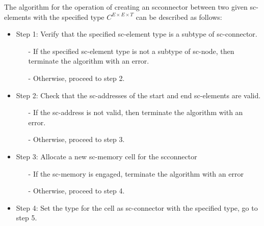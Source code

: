 \documentclass{article}
\begin{document}
\begin{multicols}{2}
The algorithm for the operation of creating an scconnector between two given sc-elements with the specified type \textit{$C^{E\times{E\times{T}}}$} can be described as follows:

\begin{itemize}
\itemsep=0mm
\item Step 1: Verify that the specified sc-element type is
a subtype of sc-connector.


\begin{itemize}
\itemsep=0mm
\item[-]If the specified sc-element type is not a subtype
of sc-node, then terminate the algorithm with an
error.

\item[-]Otherwise, proceed to step 2.
\end{itemize}
\end{itemize}

\begin{itemize}
\itemsep=0mm
\item Step 2: Check that the sc-addresses of the start and
end sc-elements are valid.


\begin{itemize}
\itemsep=0mm
\item[-] If the sc-address is not valid, then terminate the
algorithm with an error.

\item[-]Otherwise, proceed to step 3.
\end{itemize}
\end{itemize}

\begin{itemize}
\itemsep=0mm
\item Step 3: Allocate a new sc-memory cell for the scconnector

\begin{itemize}
\itemsep=0mm
\item[-] If the sc-memory is engaged, terminate the algorithm with an error

\item[-]Otherwise, proceed to step 4.
\end{itemize}
\end{itemize}

\begin{itemize}
\itemsep=0mm
\item Step 4: Set the type for the cell as sc-connector with
the specified type, go to step 5.
\end{itemize}


\end{multicols}
\end{document}
